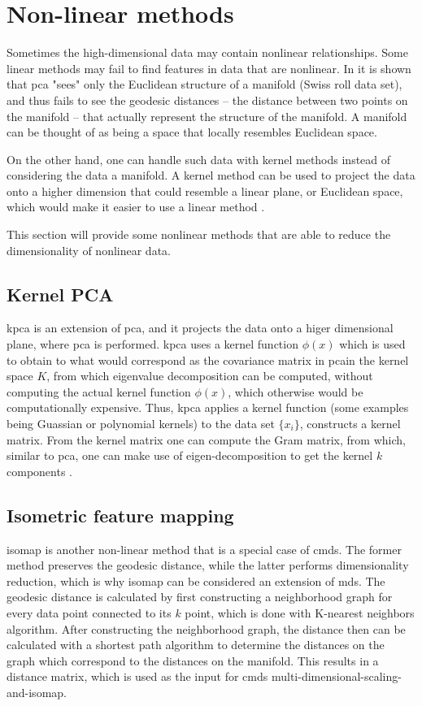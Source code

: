 
\section{Non-linear methods}\label{sec:non-linear-methods}
Sometimes the high-dimensional data may contain nonlinear relationships. Some linear methods may fail to find features in data that are nonlinear. In \cite{Tennenbaum} it is shown that \gls{pca} "sees" only the Euclidean structure of a manifold (Swiss roll data set), and thus fails to see the geodesic distances -- the distance between two points on the manifold -- that actually represent the structure of the manifold. A manifold can be thought of as being a space that locally resembles Euclidean space.

On the other hand, one can handle such data with kernel methods instead of considering the data a manifold. A kernel method can be used to project the data onto a higher dimension that could resemble a linear plane, or Euclidean space, which would make it easier to use a linear method \cite{LVD}.

This section will provide some nonlinear methods that are able to reduce the dimensionality of nonlinear data.


\subsection{Kernel PCA}\label{subsec:kernel-pca}
\gls{kpca} is an extension of \gls{pca}, and it projects the data onto a higer dimensional plane, where \gls{pca} is performed. \gls{kpca} uses a kernel function $\phi (x)$ which is used to obtain to what would correspond as the covariance matrix in \gls{pca}in the kernel space $K$, from which eigenvalue decomposition can be computed, without computing the actual kernel function $\phi (x)$, which otherwise would be computationally expensive. Thus, \gls{kpca} applies a kernel function (some examples being Guassian or polynomial kernels) to the data set $ \{x_{i} \}$, constructs a kernel matrix. From the kernel matrix one can compute the Gram matrix, from which, similar to \gls{pca}, one can make use of eigen-decomposition to get the kernel $k$ components \cite{kernel-pca}.


\subsection{Isometric feature mapping}\label{subsec:isometric-feature-mapping}
\gls{isomap} is another non-linear method that is a special case of \gls{cmds}. The former method preserves the geodesic distance, while the latter performs dimensionality reduction, which is why \gls{isomap} can be considered an extension of \gls{mds}. The geodesic distance is calculated by first constructing a neighborhood graph for every data point connected to its $k$ point, which is done with K-nearest neighbors algorithm. After constructing the neighborhood graph, the distance then can be calculated with a shortest path algorithm to determine the distances on the graph which correspond to the distances on the manifold. This results in a distance matrix, which is used as the input for \gls{cmds} multi-dimensional-scaling-and-isomap.




